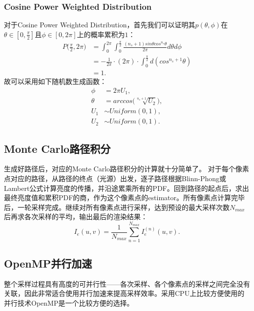 \documentclass[10pt,a4paper]{article}
\begin{document}
\subsubsection{Cosine Power Weighted Distribution}
对于Cosine Power Weighted Distribution，首先我们可以证明其$p(\theta, \phi)$在$\theta \in [0, \frac{\pi}{2}]$且$\phi \in [0, 2\pi]$上的概率累积为$1$：
\begin{equation}
  \begin{split}
    P\big(\frac{\pi}{2}, 2\pi\big)
      &= \int_0^{2\pi} \int_0^{\frac{\pi}{2}}
         \frac{(n_s+1) sin\theta cos^{n_s}\theta}{2\pi}
         d\theta d\phi  \\
      &= -\frac{1}{2\pi} \cdot (2\pi) \cdot \int_0^{\frac{\pi}{2}} d(cos^{n_s+1}\theta)  \\
      &= 1.
  \end{split}
\end{equation}
故可以采用如下随机数生成函数：
\begin{equation}
  \begin{split}
    \phi &= 2\pi U_1,  \\
    \theta &= arccos\big(\sqrt[n_s+1]{U_2}\big),  \\
    U_1 &\sim Uniform(0, 1),  \\
    U_2 &\sim Uniform(0, 1).
  \end{split}
\end{equation}

\subsection{Monte Carlo路径积分}
生成好路径后，对应的Monte Carlo路径积分的计算就十分简单了。 对于每个像素点对应的路径，从路径的终点（光源）出发，逐子路径根据Blinn-Phong或Lambert公式计算亮度的传播，并沿途累乘所有的PDF。回到路径的起点后，求出最终亮度值和累积PDF的商，作为这个像素点的estimator。所有像素点计算完毕后，一轮采样完成。继续对所有像素点进行采样，达到预设的最大采样次数$N_{max}$后再求各次采样的平均，输出最后的渲染结果：
\begin{equation}
  I_e(u, v) = \frac{1}{N_{max}} \sum_{n=1}^{N_{max}} I_e^{(n)}(u, v).
\end{equation}

\subsection{OpenMP并行加速}
整个采样过程具有高度的可并行性——各次采样、各个像素点的采样之间完全没有关联，因此非常适合使用并行加速来提高采样效率。采用CPU上比较方便使用的并行技术OpenMP是一个比较方便的选择。
\end{document}
